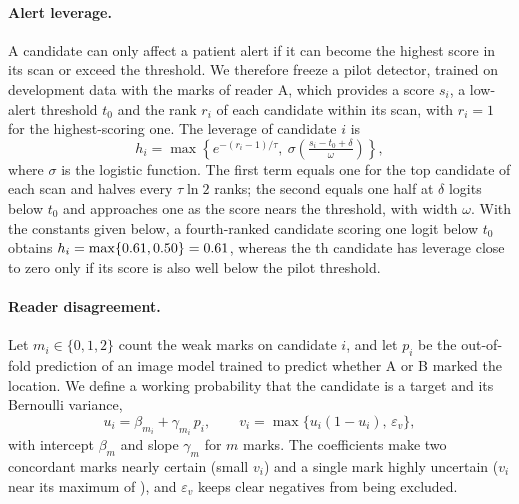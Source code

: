 \paragraph{Alert leverage.}
A candidate can only affect a patient alert if it can become the highest score in its scan or exceed the threshold. We therefore freeze a pilot detector, trained on development data with the marks of reader A, which provides a score $s_i$, a low-alert threshold $t_0$ and the rank $r_i$ of each candidate within its scan, with $r_i=1$ for the highest-scoring one. The leverage of candidate $i$ is
\begin{equation}
 h_i=\max\!\left\{e^{-(r_i-1)/\tau},\ \sigma\!\left(\tfrac{s_i-t_0+\delta}{\omega}\right)\right\},
 \label{eq:leverage}
\end{equation}
where $\sigma$ is the logistic function. The first term equals one for the top candidate of each scan and halves every $\tau\ln 2$ ranks; the second equals one half at $\delta$ logits below $t_0$ and approaches one as the score nears the threshold, with width $\omega$. With the constants given below, a fourth-ranked candidate scoring one logit below $t_0$ obtains $h_i=\max\{0.61,0.50\}=0.61$, whereas the \ExFarRank{}th candidate has leverage close to zero only if its score is also well below the pilot threshold.

\paragraph{Reader disagreement.}
Let $m_i\in\{0,1,2\}$ count the weak marks on candidate $i$, and let $p_i$ be the out-of-fold prediction of an image model trained to predict whether A or B marked the location. We define a working probability that the candidate is a target and its Bernoulli variance,
\begin{equation}
 u_i=\beta_{m_i}+\gamma_{m_i}\,p_i,\qquad v_i=\max\{u_i(1-u_i),\,\varepsilon_v\},
 \label{eq:working}
\end{equation}
with intercept $\beta_m$ and slope $\gamma_m$ for $m$ marks. The coefficients make two concordant marks nearly certain (small $v_i$) and a single mark highly uncertain ($v_i$ near its maximum of \VarMax{}), and $\varepsilon_v$ keeps clear negatives from being excluded.

